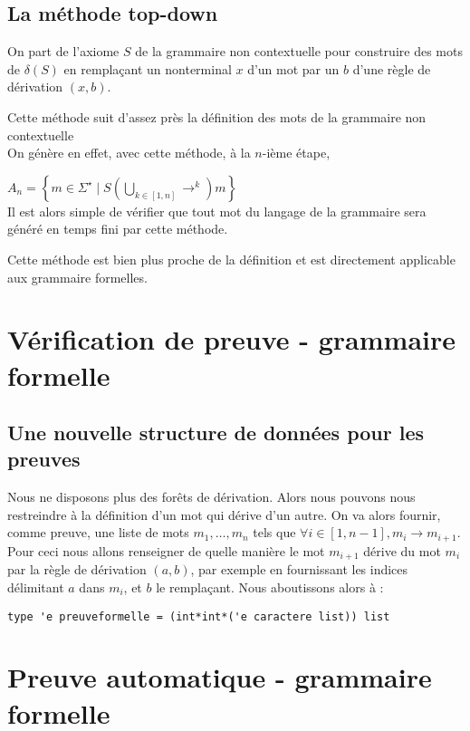 \documentclass[a4paper,12pt]{article}
\begin{document}
\subsection{La méthode top-down}

On part de l'axiome $S$ de la grammaire non contextuelle pour construire des mots de $\delta(S)$ en remplaçant un nonterminal $x$ d'un mot par un $b$ d'une règle de dérivation $(x,b)$.

Cette méthode suit d'assez près la définition des mots de la grammaire non contextuelle\\
On génère en effet, avec cette méthode, à la $n$-ième étape, 

$A_n = \left\{m \in \Sigma^\star \mid  S \left(\bigcup_{k \in [1,n]} \rightarrow^k\right) m\right\}$\\
Il est alors simple de vérifier que tout mot du langage de la grammaire sera généré en temps fini par cette méthode.


Cette méthode est bien plus proche de la définition et est directement applicable aux grammaire formelles.

\section{Vérification de preuve - grammaire formelle}

\subsection{Une nouvelle structure de données pour les preuves}

Nous ne disposons plus des forêts de dérivation. Alors nous pouvons nous restreindre à la définition d'un mot qui dérive d'un autre.
On va alors fournir, comme preuve, une liste de mots $m_1, \dots, m_n$ tels que $\forall i\in [1,n-1], m_i \rightarrow m_{i+1}$. 
Pour ceci nous allons renseigner de quelle manière le mot $m_{i+1}$ dérive du mot $m_i$ par la règle de dérivation $(a,b)$, par exemple en fournissant les indices délimitant $a$ dans $m_i$, et $b$ le remplaçant.
Nous aboutissons alors à :
{\color{DarkBlue}\begin{verbatim}
type 'e preuveformelle = (int*int*('e caractere list)) list
\end{verbatim}}




\section{Preuve automatique - grammaire formelle}
\end{document}

